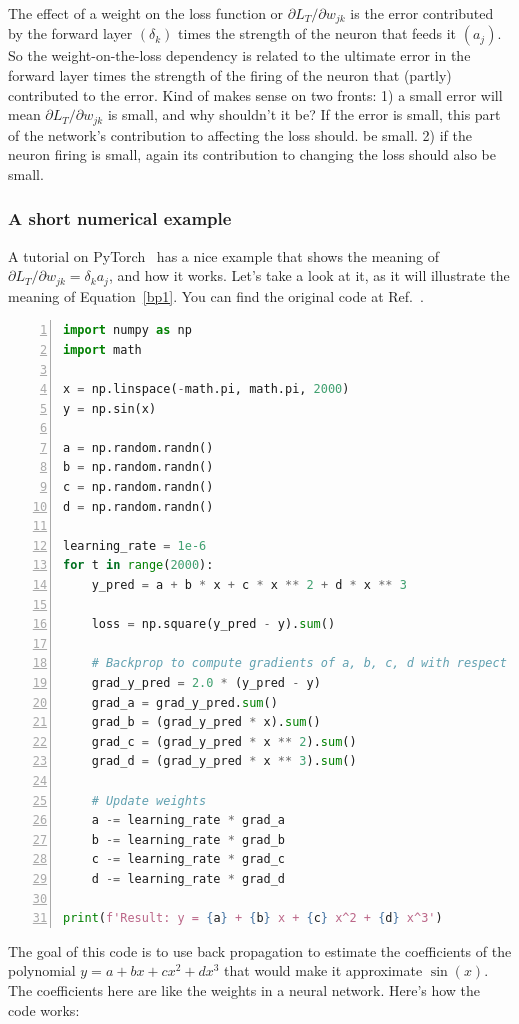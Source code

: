 \documentclass[12pt]{article}
\begin{document}
The effect of a weight on the loss function or ${\partial L_T}/{\partial w_{jk}}$ is the error contributed by the forward layer $(\delta_k)$ times the strength of the neuron that feeds it $(a_j)$. So the weight-on-the-loss dependency is related to the ultimate error in the forward layer times the strength of the firing of the neuron that (partly) contributed to the error. Kind of makes sense on two fronts: 1) a small error will mean ${\partial L_T}/{\partial w_{jk}}$ is small, and why shouldn't it be? If the error is small, this part of the network's contribution to affecting the loss should. be small.  2) if the neuron firing is small, again its contribution to changing the loss should also be small.

\subsubsection{A short numerical example}

A tutorial on PyTorch~\cite{pytorch} has a nice example that shows the meaning of ${\partial L_T}/{\partial w_{jk}} = \delta_k a_j$, and how it works. Let's take a look at it, as it will illustrate the meaning of Equation~\ref{bp1}. You can find the original code at Ref.~\cite{pytorch_grad}.

\begin{lstlisting}[language=Python,
		basicstyle=\small\ttfamily,
                 numbers=left,
                 stepnumber=1,
                 numbersep=8pt,
                 tabsize=2,
                 showspaces=false,
                 breaklines=true,
                 showstringspaces=false,
                 columns=fullflexible]
import numpy as np
import math

x = np.linspace(-math.pi, math.pi, 2000)
y = np.sin(x)

a = np.random.randn()
b = np.random.randn()
c = np.random.randn()
d = np.random.randn()

learning_rate = 1e-6
for t in range(2000):
    y_pred = a + b * x + c * x ** 2 + d * x ** 3

    loss = np.square(y_pred - y).sum()

    # Backprop to compute gradients of a, b, c, d with respect to loss
    grad_y_pred = 2.0 * (y_pred - y)
    grad_a = grad_y_pred.sum()
    grad_b = (grad_y_pred * x).sum()
    grad_c = (grad_y_pred * x ** 2).sum()
    grad_d = (grad_y_pred * x ** 3).sum()

    # Update weights
    a -= learning_rate * grad_a
    b -= learning_rate * grad_b
    c -= learning_rate * grad_c
    d -= learning_rate * grad_d

print(f'Result: y = {a} + {b} x + {c} x^2 + {d} x^3')
\end{lstlisting}
The goal of this code is to use back propagation to estimate the coefficients of the polynomial $y=a+bx+cx^2+dx^3$ that would make it approximate $\sin(x)$.  The coefficients here are like the weights in a neural network.  Here's how the code works:
\end{document}
